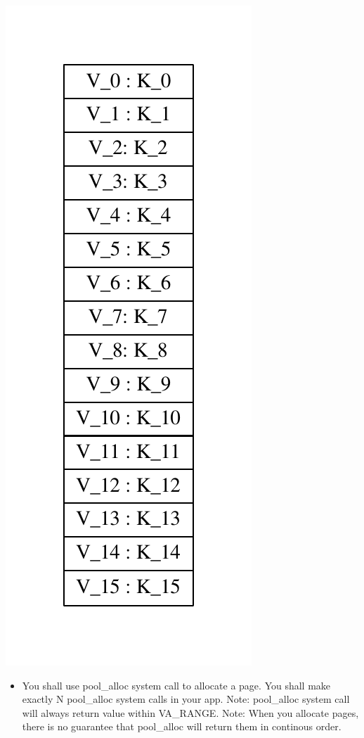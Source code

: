\documentclass[]{article}
\providecommand{\tightlist}{%
  \setlength{\itemsep}{0pt}\setlength{\parskip}{0pt}}
\begin{document}
\includegraphics{graphviz-images/925fb07dd8a75351299f096096fd68d723c5a480.pdf}

\begin{itemize}
\tightlist
\item
  You shall use pool\_alloc system call to allocate a page. You shall
  make exactly N pool\_alloc system calls in your app. Note: pool\_alloc
  system call will always return value within VA\_RANGE. Note: When you
  allocate pages, there is no guarantee that pool\_alloc will return
  them in continous order.
\end{itemize}
\end{document}
